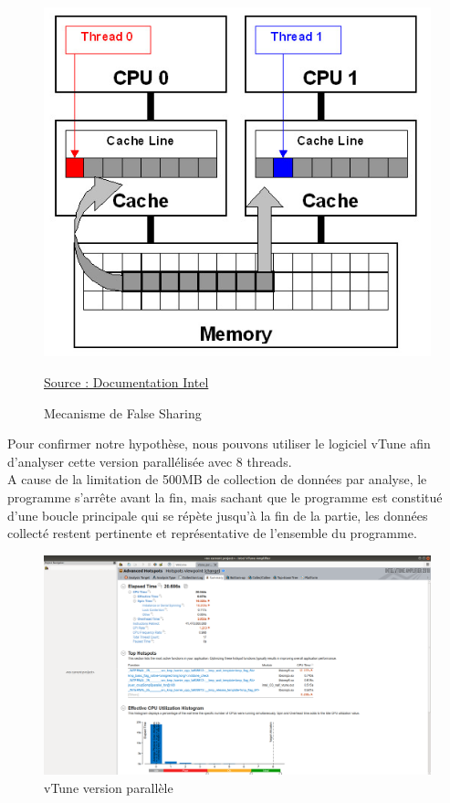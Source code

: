 \documentclass[
 aip,
 jmp,
 amsmath,amssymb,
 reprint
]{revtex4-1}
\begin{document}
\begin{figure}[H]
  \includegraphics[width=\linewidth, keepaspectratio=true]{false_sharing.jpg}
  \centering
  \caption{Mecanisme de False Sharing\label{Fig:false_sharing}}{\href{https://software.intel.com/en-us/articles/avoiding-and-identifying-false-sharing-among-threads}{Source : Documentation Intel}}
\end{figure}

Pour confirmer notre hypothèse, nous pouvons utiliser le logiciel vTune afin d'analyser cette version parallélisée avec 8 threads.\\
A cause de la limitation de 500MB de collection de données par analyse, le programme s'arrête avant la fin, mais sachant que le programme est constitué d'une boucle principale qui se répète jusqu'à la fin de la partie, les données collecté restent pertinente et représentative de l'ensemble du programme.

\begin{figure}[H]
  \includegraphics[width=\linewidth, keepaspectratio=true]{vtune_parallel.png}
  \centering
  \caption{vTune version parallèle\label{Fig:vtune_proc_use}}
\end{figure}
\end{document}
